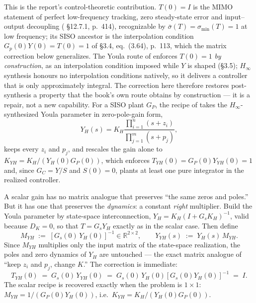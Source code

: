 \documentclass[energies,article,submit,pdftex,oneauthor]{Definitions/mdpi}
\begin{document}
This is the report's control-theoretic contribution. $T(0)=I$ is the MIMO statement of perfect
low-frequency tracking, zero steady-state error and input--output decoupling
(\citep{assadian2020neoclassical} \S12.7.1, p.~414), recognizable by
$\bar\sigma(T) = \sigma_{\min}(T) = 1$ at low frequency; its SISO ancestor is the interpolation
condition $G_p(0)Y(0) = T(0) = 1$ of \S3.4, eq.~(3.64), p.~113, which the matrix correction below
generalizes. The Youla route of
\citep{assadian2020neoclassical} enforces $T(0)=1$ \emph{by construction}, as an interpolation
condition imposed while $Y$ is shaped (\S3.5); $H_\infty$ synthesis honours no interpolation
conditions natively, so it delivers a controller that is only approximately integral. The
correction here therefore restores post-synthesis a property that the book's own route obtains
by construction --- it is a repair, not a new capability. For a SISO plant $G_P$, the recipe of
\citep{tan2025youlah} takes the $H_\infty$-synthesized Youla parameter in zero-pole-gain form,
\begin{equation}\label{eq:YH}
Y_H(s) = K_H \frac{\prod_{i=1}^{n}(s+z_i)}{\prod_{j=1}^{m}(s+p_j)},
\end{equation}
keeps every $z_i$ and $p_j$, and rescales the gain alone to $K_{YH} = K_H/(Y_H(0)G_P(0))$, which
enforces $T_{YH}(0) = G_P(0)Y_{YH}(0) = 1$ and, since $G_C = Y/S$ and $S(0)=0$, plants at least
one pure integrator in the realized controller.

A scalar gain has no matrix analogue that preserves ``the same zeros and poles.'' But it has one
that preserves the \emph{dynamics}: a constant \emph{right} multiplier. Build the Youla parameter
by state-space interconnection, $Y_H = K_H(I + G_s K_H)^{-1}$, valid because $D_K = 0$, so that
$T = G_s Y_H$ exactly as in the scalar case. Then define
\begin{equation}\label{eq:M}
M_{YH} \;:=\; \left[G_s(0)\,Y_H(0)\right]^{-1} \in \mathbb{R}^{2\times2},
\qquad
Y_{YH}(s) \;:=\; Y_H(s)\,M_{YH} .
\end{equation}
Since $M_{YH}$ multiplies only the input matrix of the state-space realization, the poles and zero
dynamics of $Y_H$ are untouched --- the exact matrix analogue of ``keep $z_i$ and $p_j$, change
$K$.'' The correction is immediate:
\begin{equation}\label{eq:T0}
T_{YH}(0) \;=\; G_s(0)\,Y_{YH}(0) \;=\; G_s(0)\,Y_H(0)\left[G_s(0)Y_H(0)\right]^{-1} \;=\; I .
\end{equation}
The scalar recipe is recovered exactly when the problem is $1\times1$:
$M_{YH} = 1/(G_P(0)Y_H(0))$,
i.e.\ $K_{YH} = K_H/(Y_H(0)G_P(0))$.
\end{document}
